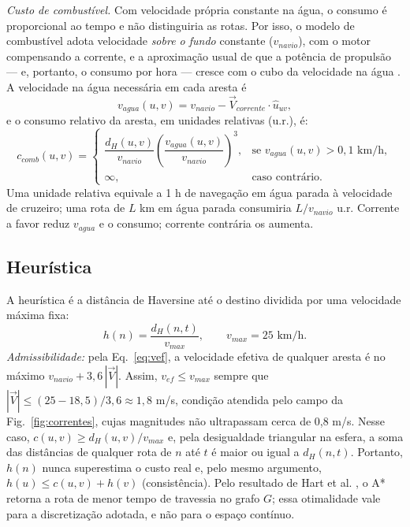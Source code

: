 \documentclass[conference]{IEEEtran}
\begin{document}
\textit{Custo de combustível.} Com velocidade própria constante na água, o consumo é proporcional ao tempo e não distinguiria as rotas. Por isso, o modelo de combustível adota velocidade \emph{sobre o fundo} constante ($v_{navio}$), com o motor compensando a corrente, e a aproximação usual de que a potência de propulsão --- e, portanto, o consumo por hora --- cresce com o cubo da velocidade na água \cite{psaraftis}. A velocidade na água necessária em cada aresta é
\begin{equation}
v_{agua}(u,v) = v_{navio} - \vec{V}_{corrente} \cdot \hat{u}_{uv},
\label{eq:vagua}
\end{equation}
e o consumo relativo da aresta, em unidades relativas (u.r.), é:
\begin{equation}
c_{comb}(u,v) =
\begin{cases}
\dfrac{d_H(u,v)}{v_{navio}}\left(\dfrac{v_{agua}(u,v)}{v_{navio}}\right)^{3}, & \text{se } v_{agua}(u,v) > 0{,}1 \text{ km/h},\\[2mm]
\infty, & \text{caso contrário.}
\end{cases}
\label{eq:ccomb}
\end{equation}
Uma unidade relativa equivale a 1 h de navegação em água parada à velocidade de cruzeiro; uma rota de $L$ km em água parada consumiria $L/v_{navio}$ u.r. Corrente a favor reduz $v_{agua}$ e o consumo; corrente contrária os aumenta.

\subsection{Heurística}
A heurística é a distância de Haversine até o destino dividida por uma velocidade máxima fixa:
\begin{equation}
h(n) = \frac{d_H(n,t)}{v_{max}}, \qquad v_{max} = 25 \text{ km/h}.
\label{eq:h}
\end{equation}
\textit{Admissibilidade:} pela Eq.~\ref{eq:vef}, a velocidade efetiva de qualquer aresta é no máximo $v_{navio} + 3{,}6\,|\vec{V}|$. Assim, $v_{ef} \leq v_{max}$ sempre que $|\vec{V}| \leq (25 - 18{,}5)/3{,}6 \approx 1{,}8$ m/s, condição atendida pelo campo da Fig.~\ref{fig:correntes}, cujas magnitudes não ultrapassam cerca de 0,8 m/s. Nesse caso, $c(u,v) \geq d_H(u,v)/v_{max}$ e, pela desigualdade triangular na esfera, a soma das distâncias de qualquer rota de $n$ até $t$ é maior ou igual a $d_H(n,t)$. Portanto, $h(n)$ nunca superestima o custo real e, pelo mesmo argumento, $h(u) \leq c(u,v) + h(v)$ (consistência). Pelo resultado de Hart et al. \cite{hart}, o A* retorna a rota de menor tempo de travessia no grafo $G$; essa otimalidade vale para a discretização adotada, e não para o espaço contínuo.
\end{document}
